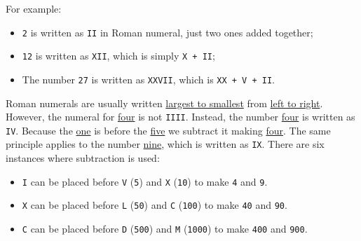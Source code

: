 For example:
\begin{itemize}
\item {\colorbox{CodeBackground}{\lstinline|2|}} is written as {\colorbox{CodeBackground}{\lstinline|II|}} in Roman numeral, just two ones added together;
\item {\colorbox{CodeBackground}{\lstinline|12|}} is written as {\colorbox{CodeBackground}{\lstinline|XII|}}, which is simply {\colorbox{CodeBackground}{\lstinline|X + II|}};
\item The number {\colorbox{CodeBackground}{\lstinline|27|}} is written as {\colorbox{CodeBackground}{\lstinline|XXVII|}}, which is {\colorbox{CodeBackground}{\lstinline|XX + V + II|}}.
\end{itemize}\mbox{}

Roman numerals are usually written \ul{largest to smallest} from \ul{left to right}. However, the numeral for \ul{four} is not {\colorbox{CodeBackground}{\lstinline|IIII|}}. Instead, the number \ul{four} is written as {\colorbox{CodeBackground}{\lstinline|IV|}}. Because the \ul{one} is before the \ul{five} we subtract it making \ul{four}. The same principle applies to the number \ul{nine}, which is written as {\colorbox{CodeBackground}{\lstinline|IX|}}. There are six instances where subtraction is used:
\begin{itemize}
\item {\colorbox{CodeBackground}{\lstinline|I|}} can be placed before {\colorbox{CodeBackground}{\lstinline|V|}} ({\colorbox{CodeBackground}{\lstinline|5|}}) and {\colorbox{CodeBackground}{\lstinline|X|}} ({\colorbox{CodeBackground}{\lstinline|10|}}) to make {\colorbox{CodeBackground}{\lstinline|4|}} and {\colorbox{CodeBackground}{\lstinline|9|}}. 
\item {\colorbox{CodeBackground}{\lstinline|X|}} can be placed before {\colorbox{CodeBackground}{\lstinline|L|}} ({\colorbox{CodeBackground}{\lstinline|50|}}) and {\colorbox{CodeBackground}{\lstinline|C|}} ({\colorbox{CodeBackground}{\lstinline|100|}}) to make {\colorbox{CodeBackground}{\lstinline|40|}} and {\colorbox{CodeBackground}{\lstinline|90|}}. 
\item {\colorbox{CodeBackground}{\lstinline|C|}} can be placed before {\colorbox{CodeBackground}{\lstinline|D|}} ({\colorbox{CodeBackground}{\lstinline|500|}}) and {\colorbox{CodeBackground}{\lstinline|M|}} ({\colorbox{CodeBackground}{\lstinline|1000|}}) to make {\colorbox{CodeBackground}{\lstinline|400|}} and {\colorbox{CodeBackground}{\lstinline|900|}}.
\end{itemize}

